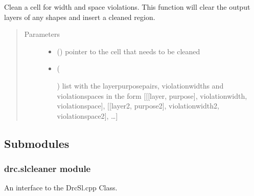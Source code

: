 \documentclass[a4paper,10pt,english]{sphinxmanual}
\begin{document}
\begin{fulllineitems}
\label{\detokenize{drc:drc.clean}}
Clean a cell for width and space violations.
This function will clear the output layers of any shapes and insert a cleaned region.
\begin{quote}\begin{description}
\item[{Parameters}] \leavevmode\begin{itemize}
\item {} 
 () \textendash{} pointer to the cell that needs to be cleaned

\item {} 
 (%
\begin{footnote}[5]\sphinxAtStartFootnote
{}
%
\end{footnote}) \textendash{} list with the layerpurposepairs, violationwidths and violationspaces in the form {[}{[}{[}layer,
purpose{]}, violationwidth, violationspace{]}, {[}{[}layer2, purpose2{]}, violationwidth2, violationspace2{]}, …{]}

\end{itemize}

\end{description}\end{quote}

\end{fulllineitems}



\subsection{Submodules}
\label{\detokenize{drc:submodules}}

\subsubsection{drc.slcleaner module}
\label{\detokenize{drc:drc-slcleaner-module}}\label{\detokenize{drc:slcleaner}}
An interface to the DrcSl.cpp Class.
\end{document}

